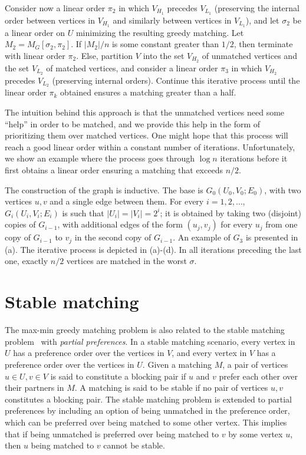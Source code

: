 Consider now a linear order $\pi_2$ in which $V_{H_1}$ precedes $V_{L_1}$ (preserving the internal order between vertices in $V_{H_1}$ and similarly between vertices in $V_{L_1}$), and let $\sigma_2$ be a linear order on $U$ minimizing the resulting greedy matching.
Let $M_2=M_G[\sigma_2,\pi_2]$.
If $|M_2|/n$ is some constant greater than $1/2$, then terminate with linear order $\pi_2$.
Else, partition $V$ into the set $V_{H_2}$ of unmatched vertices and the set $V_{L_2}$ of matched vertices, and consider a linear order $\pi_3$ in which $V_{H_2}$ precedes $V_{L_2}$ (preserving internal orders).
Continue this iterative process until the
%
linear order $\pi_k$ obtained  %
ensures a matching greater than a half.

The intuition behind this approach is that the unmatched vertices need some ``help'' in order to be matched, and we provide this help in the form of
prioritizing them over matched vertices. %
%
%
One might hope that this process will reach a good linear order within a constant number of iterations.
Unfortunately, we show an example where the process goes through $\log n$ iterations before it first obtains a linear order ensuring a matching that exceeds $n/2$.

The construction of the graph is inductive.
The base is $G_0(U_0,V_0;E_0)$, with two vertices $u,v$ and a single edge between them.
For every $i=1,2,\ldots$, $G_i(U_i,V_i;E_i)$ is such that $|U_i|=|V_i|=2^i$; it is obtained by taking two (disjoint) copies of $G_{i-1}$, with additional edges of the form $(u_j,v_j)$ for every $u_j$ from one copy of $G_{i-1}$ to $v_j$ in the second copy of $G_{i-1}$.
An example of $G_3$ is presented in (a).
The iterative process is depicted in (a)-(d).
In all iterations preceding the last one, exactly $n/2$ vertices are matched in the worst $\sigma$.

\section{Stable matching}
\label{sec:stable-matching}
The max-min greedy matching problem is also related to the stable matching problem~\cite{GS62} with \emph{partial preferences}.
In a stable matching scenario, every vertex in $U$ has a preference order over %
the vertices in $V$, and every vertex in $V$ has a preference order over %
the vertices in $U$. Given a matching $M$, a pair of vertices $u \in U, v \in V$ is said to constitute a blocking pair if $u$ and $v$ %
prefer each other over their partners in $M$. A matching is said to be stable if no pair of vertices $u,v$ constitutes a blocking pair. The stable matching problem is extended to partial preferences by including an option of being unmatched in the preference order, which can be preferred over being matched to some other vertex. This implies that if %
being  %
unmatched is preferred over being matched to $v$ by some vertex $u$, then $u$ being matched to $v$ cannot be stable.  
%
%
%
%

